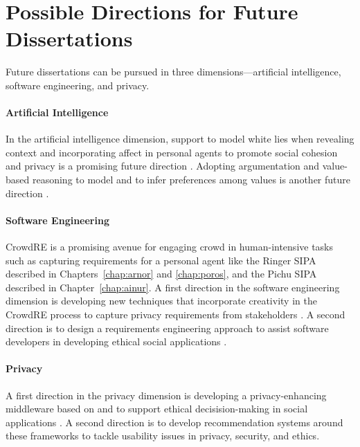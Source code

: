 \section{Possible Directions for Future Dissertations}
Future dissertations can be pursued in three dimensions---artificial intelligence, software engineering, and privacy.

\paragraph*{Artificial Intelligence}
In the artificial intelligence dimension, support to model white lies when revealing context and incorporating affect in personal agents to promote social cohesion and privacy is a promising future direction \cite{IJCAI-18:Poros}.
Adopting argumentation and value-based reasoning to model and to infer preferences among values is another future direction \cite{Ajmeri-IJCAI16-Coco}.

\paragraph*{Software Engineering}
CrowdRE is a promising avenue for engaging crowd in human-intensive tasks such as capturing requirements for a personal agent like the Ringer SIPA described in Chapters~\ref{chap:arnor} and \ref{chap:poros}, and the Pichu SIPA described in Chapter~\ref{chap:ainur}. 
A first direction in the software engineering dimension is developing new techniques that incorporate creativity in the CrowdRE process to capture privacy requirements from stakeholders \cite{Murukannaiah-RE16-Creative}. 
A second direction is to design a requirements engineering approach to assist software developers in developing ethical social applications \cite{Ajmeri-AAMAS17-Arnor,Ajmeri-IC18-Ethical}. 


\paragraph*{Privacy}

A first direction in the privacy dimension is developing a privacy-enhancing middleware based on \frameworkB and \frameworkAinur to support ethical decisision-making in social applications \cite{Ajmeri-hotsos18-Ethics,Murukannaiah-TOSEM15-Platys}.
A second direction is to develop recommendation systems around these frameworks to tackle usability issues in privacy, security, and ethics.
 

